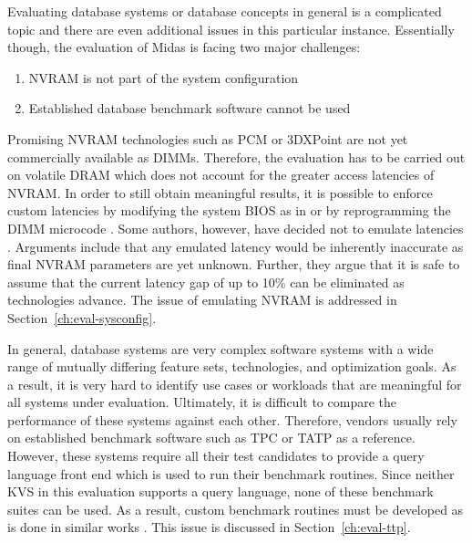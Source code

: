 Evaluating database systems or database concepts in general is a complicated
topic and there are even additional issues in this particular instance.
Essentially though, the evaluation of Midas is facing two major challenges:

\begin{enumerate}
    \item \ac{NVRAM} is not part of the system configuration
    \item Established database benchmark software cannot be used
\end{enumerate}

Promising \ac{NVRAM} technologies such as \ac{PCM} or 3DXPoint are not yet
commercially available as \acp{DIMM}. Therefore, the evaluation has to be
carried out on volatile \ac{DRAM} which does not account for the greater access
latencies of \ac{NVRAM}. In order to still obtain meaningful results, it is
possible to enforce custom latencies by modifying the system BIOS as in
\cite{dulloor2014system, oukid2015instant} or by reprogramming the \ac{DIMM}
microcode \cite{schwalb2016hyrise}. Some authors, however, have decided not to
emulate latencies \cite{bailey2013exploring, zhou2016nvht}. Arguments include
that any emulated latency would be inherently inaccurate as final \ac{NVRAM}
parameters are yet unknown. Further, they argue that it is safe to assume that
the current latency gap of up to 10\% can be eliminated as technologies advance.
The issue of emulating \ac{NVRAM} is addressed in
Section~\ref{ch:eval-sysconfig}.

In general, database systems are very complex software systems with a wide range
of mutually differing feature sets, technologies, and optimization goals. As a
result, it is very hard to identify use cases or workloads that are meaningful
for all systems under evaluation. Ultimately, it is difficult to compare the
performance of these systems against each other. Therefore, vendors usually rely
on established benchmark software such as TPC \cite{schwalb2016hyrise} or TATP
\cite{oukid2015instant} as a reference. However, these systems require all their
test candidates to provide a query language front end which is used to run their
benchmark routines. Since neither \ac{KVS} in this evaluation supports a query
language, none of these benchmark suites can be used. As a result, custom
benchmark routines must be developed as is done in similar works
\cite{bailey2013exploring, zhou2016nvht}. This issue is discussed in
Section~\ref{ch:eval-ttp}.
